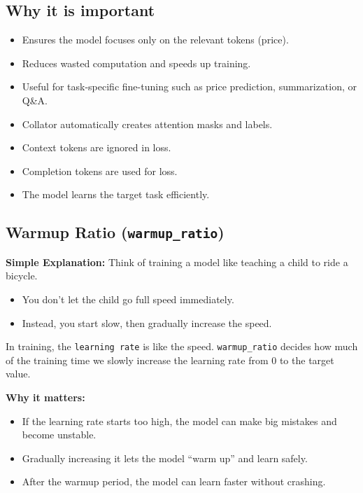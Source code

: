 \documentclass[a4paper, 12pt]{article}
\begin{document}
\subsection*{Why it is important}
\begin{itemize}
    \item Ensures the model focuses only on the relevant tokens (price).
    \item Reduces wasted computation and speeds up training.
    \item Useful for task-specific fine-tuning such as price prediction, summarization, or Q\&A.
\end{itemize}

\begin{tcolorbox}[colback=green!5!white,colframe=green!75!black,title=Summary]
\begin{itemize}
    \item Collator automatically creates attention masks and labels.
    \item Context tokens are ignored in loss.
    \item Completion tokens are used for loss.
    \item The model learns the target task efficiently.
\end{itemize}
\end{tcolorbox}

\noindent\hrulefill
\subsection*{Warmup Ratio (\texttt{warmup\_ratio})}

\textbf{Simple Explanation:}  
Think of training a model like teaching a child to ride a bicycle.  
\begin{itemize}
    \item You don’t let the child go full speed immediately.  
    \item Instead, you start slow, then gradually increase the speed.  
\end{itemize}

In training, the \texttt{learning rate} is like the speed.  
\texttt{warmup\_ratio} decides how much of the training time we slowly increase the learning rate from 0 to the target value.

\textbf{Why it matters:}  
\begin{itemize}
    \item If the learning rate starts too high, the model can make big mistakes and become unstable.  
    \item Gradually increasing it lets the model “warm up” and learn safely.  
    \item After the warmup period, the model can learn faster without crashing.  
\end{itemize}
\end{document}
